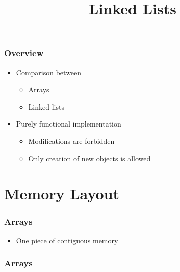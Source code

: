\documentclass{../ucll-slides}
\title{Linked Lists}
\begin{document}
\maketitle

\begin{frame}
    \frametitle{Overview}
    \begin{itemize}
        \item Comparison between
              \begin{itemize}
                  \item Arrays
                  \item Linked lists
              \end{itemize}
              \vskip4mm
        \item Purely functional implementation
              \begin{itemize}
                \item Modifications are forbidden
                \item Only creation of new objects is allowed
              \end{itemize}
    \end{itemize}
\end{frame}

\section{Memory Layout}

\frame{\tableofcontents[currentsubsection]}

\begin{frame}
    \frametitle{Arrays}
    \begin{center}
    \end{center}
    \vskip4mm
    \begin{itemize}
        \item One piece of contiguous memory
    \end{itemize}
\end{frame}

\begin{frame}
    \frametitle{Arrays}
\end{frame}
\end{document}
